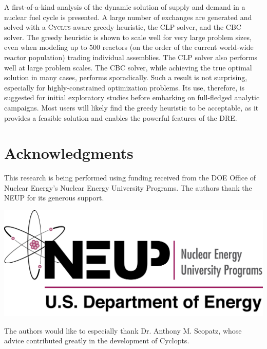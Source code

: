 \documentclass{anstrans}
\newcommand{\Cyclus}{\textsc{Cyclus}}
\begin{document}
A first-of-a-kind analysis of the dynamic solution of supply and demand in a
nuclear fuel cycle is presented. A large number of exchanges are generated and
solved with a \Cyclus-aware greedy heuristic, the CLP solver, and the CBC
solver. The greedy heuristic is shown to scale well for very large problem
sizes, even when modeling up to $500$ reactors (on the order of the current
world-wide reactor population) trading individual assemblies. The CLP solver
also performs well at large problem scales. The CBC solver, while achieving the
true optimal solution in many cases, performs sporadically. Such a result is not
surprising, especially for highly-constrained optimization problems. Its use,
therefore, is suggested for initial exploratory studies before embarking on
full-fledged analytic campaigns. Most users will likely find the greedy
heuristic to be acceptable, as it provides a feasible solution and enables the
powerful features of the DRE.


\section{Acknowledgments}

This research is being performed using funding received from the DOE
Office of Nuclear Energy's Nuclear Energy University Programs.  The
authors thank the NEUP for its generous support.

\begin{center}
\includegraphics[width=.25\columnwidth]{neup_logo_large.jpg}
\end{center}

The authors would like to especially thank Dr. Anthony M. Scopatz, whose advice
contributed greatly in the development of Cyclopts.



\end{document}
